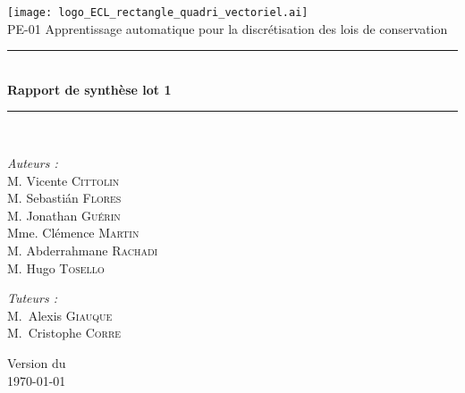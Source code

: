 \documentclass[a4paper,12pt,french]{article}
\begin{document}

\begin{titlepage}
\begin{center}

\texttt{[image: logo\_ECL\_rectangle\_quadri\_vectoriel.ai]}\\[1cm]

{\large PE-01 Apprentissage automatique pour la discrétisation des lois de conservation}\\[0.5cm]

\rule{\linewidth}{0.5mm} \\[0.4cm]
{ \huge \bfseries Rapport de synthèse lot 1 \\[0.4cm] }
\rule{\linewidth}{0.5mm} \\[1.5cm]

\noindent
\begin{minipage}{0.5\textwidth}
  \begin{flushleft} \large
    \emph{Auteurs :}\\
    M. Vicente \textsc{Cittolin}\\
    M. Sebastián \textsc{Flores}\\
    M. Jonathan \textsc{Guérin}\\
    Mme. Clémence \textsc{Martin}\\
    M. Abderrahmane \textsc{Rachadi}\\
    M. Hugo \textsc{Tosello}
  \end{flushleft}
\end{minipage}%
\begin{minipage}{0.5\textwidth}
  \begin{flushright} \large
    \emph{Tuteurs :} \\
    M.~Alexis \textsc{Giauque}\\
    M.~Cristophe \textsc{Corre}
  \end{flushright}
\end{minipage}

\vfill

{\large Version du\\ \today}

\end{center}
\end{titlepage}

\end{document}
